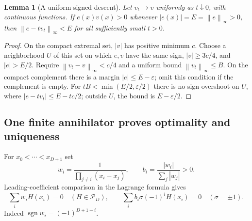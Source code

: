 \documentclass[11pt]{article}
\newcommand{\PP}{\mathcal P}
\newcommand{\norm}[1]{\left\lVert#1\right\rVert}
\newtheorem{lemma}[theorem]{Lemma}
\theoremstyle{remark}\newtheorem{remark}[theorem]{Remark}
\begin{document}
\begin{lemma}[A uniform signed descent]\label{lem:descent}
Let $v_t\to v$ uniformly as $t\downarrow0$, with continuous functions.
If $e(x)v(x)>0$ whenever $|e(x)|=E=\norm e_\infty>0$, then
$\norm{e-tv_t}_\infty<E$ for all sufficiently small $t>0$.
\end{lemma}
\begin{proof}
On the compact extremal set, $|v|$ has positive minimum $c$. Choose a
neighborhood $U$ of this set on which $e,v$ have the same sign,
$|v|\ge3c/4$, and $|e|>E/2$. Require $\norm{v_t-v}_\infty<c/4$ and a
uniform bound $\norm{v_t}_\infty\le B$. On the compact complement there
is a margin $|e|\le E-\varepsilon$; omit this condition if the complement
is empty. For $tB<\min(E/2,\varepsilon/2)$ there is no sign overshoot on
$U$, where $|e-tv_t|\le E-tc/2$; outside $U$, the bound is
$E-\varepsilon/2$.
\end{proof}

\subsection{One finite annihilator proves optimality and uniqueness}
For $x_0<\cdots<x_{D+1}$ set
\[
 w_i=\frac1{\prod_{j\ne i}(x_i-x_j)},\qquad
 b_i=\frac{|w_i|}{\sum_j|w_j|}>0.
\]
Leading-coefficient comparison in the Lagrange formula gives
\begin{equation}\label{eq:annihilator}
 \sum_i w_i H(x_i)=0\quad(H\in\PP_D),\qquad
 \sum_i b_i\sigma(-1)^i H(x_i)=0\quad(\sigma=\pm1).
\end{equation}
Indeed $\operatorname{sgn}w_i=(-1)^{D+1-i}$.
\end{document}

